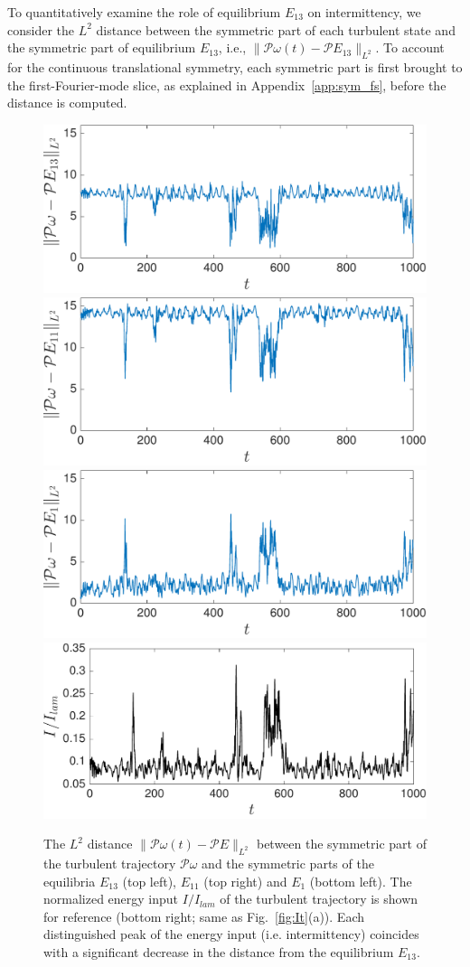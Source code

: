 \documentclass{jfm}
\begin{document}
To quantitatively examine the role of equilibrium $E_{13}$ on intermittency, we consider the $L^2$
distance between the symmetric part of each turbulent state and
the symmetric part of equilibrium $E_{13}$, i.e.,
$\|\mathcal P\omega (t)-\mathcal PE_{13}\|_{L^2}$.
To account for the continuous translational symmetry, each symmetric
part is first brought to the first-Fourier-mode slice,
as explained in Appendix~\ref{app:sym_fs}, before the distance is computed.
\begin{figure}
\centering
\includegraphics[width=.48\textwidth]{R40_distFromEQ_13}
\includegraphics[width=.48\textwidth]{R40_distFromEQ_11}\\
\includegraphics[width=.48\textwidth]{R40_distFromEQ_1}
\includegraphics[width=.48\textwidth]{R40_I}
\caption{The $L^2$ distance $\|\mathcal P\omega(t)-\mathcal PE\|_{L^2}$
between the symmetric part of the turbulent trajectory $\mathcal{P}\omega$
and the symmetric parts of the equilibria $E_{13}$ (top left), 
$E_{11}$ (top right) and $E_{1}$ (bottom left).
The normalized
energy input $I/I_{lam}$  of the turbulent
trajectory is shown for reference (bottom right; same as Fig.~\ref{fig:It}(a)).
Each distinguished peak of the energy input (i.e. intermittency) coincides with a significant
decrease in the distance from the equilibrium $E_{13}$.}
\label{fig:distE13}
\end{figure}
\end{document}

